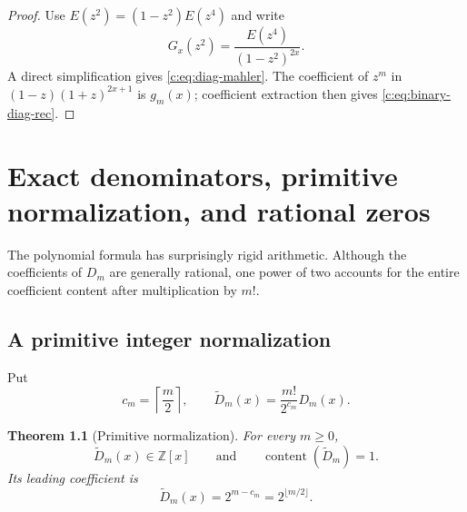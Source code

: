 \documentclass[11pt,a4paper,oneside,openany]{book}
\numberwithin{equation}{chapter}
\newtheorem{theorem}{Theorem}[chapter]
\theoremstyle{definition}
\theoremstyle{remark}
\newcommand{\Z}{\mathbb Z}
\newcommand{\K}{E}
\newcommand{\Diag}{D}
\newcommand{\Dprim}{\widetilde D}
\begin{document}
\begin{proof}
Use \(\K(z^2)=(1-z^2)\K(z^4)\) and write
\[
 G_x(z^2)=\frac{\K(z^4)}{(1-z^2)^{2x}}.
\]
A direct simplification gives \cref{c:eq:diag-mahler}.  The coefficient of
\(z^m\) in \((1-z)(1+z)^{2x+1}\) is \(g_m(x)\); coefficient extraction
then gives \cref{c:eq:binary-diag-rec}.
\end{proof}
\chapter{Exact denominators, primitive normalization, and rational zeros}
\label{b:sec:arithmetic}\label{ch:arithmetic}

The polynomial formula has surprisingly rigid arithmetic.  Although the
coefficients of $\Diag_m$ are generally rational, one power of two accounts
for the entire coefficient content after multiplication by $m!$.

\section{A primitive integer normalization}

Put
\begin{equation}
 c_m=\left\lceil\frac m2\right\rceil,
 \qquad
 \Dprim_m(x)=\frac{m!}{2^{c_m}}\Diag_m(x).
 \label{b:eq:Qm}
\end{equation}

\begin{theorem}[Primitive normalization]
\label{b:thm:primitive}
For every $m\ge0$,
\begin{equation}
 \Dprim_m(x)\in\Z[x]
 \qquad\text{and}\qquad
 \operatorname{content}(\Dprim_m)=1.
 \label{b:eq:primitive}
\end{equation}
Its leading coefficient is
\begin{equation}
 [x^m]\Dprim_m(x)=2^{m-c_m}=2^{\lfloor m/2\rfloor}.
 \label{b:eq:Q-leading}
\end{equation}
\end{theorem}
\end{document}
